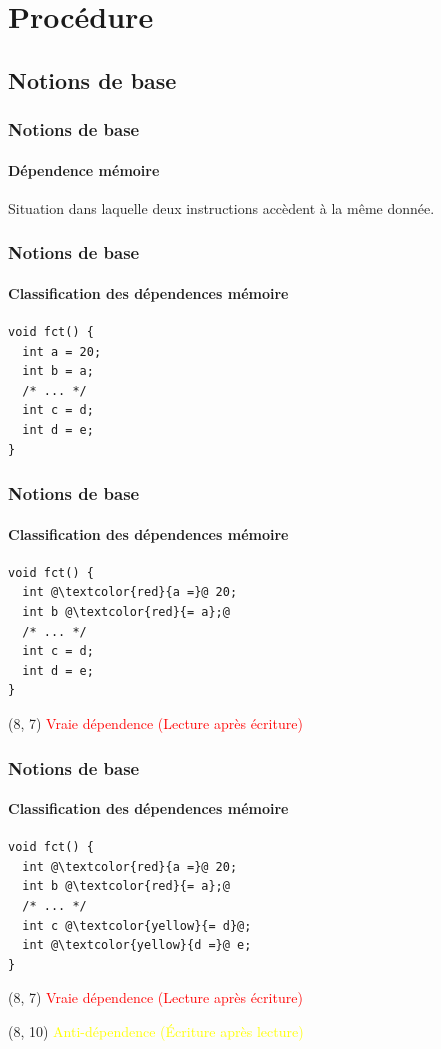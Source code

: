 \documentclass{beamer}
\begin{document}
\section{Procédure}
\subsection{Notions de base}
\begin{frame}
\frametitle{Notions de base}
\framesubtitle{Dépendence mémoire}
Situation dans laquelle deux instructions accèdent à la même donnée.
\end{frame}

\begin{frame}[fragile]
\frametitle{Notions de base}
\framesubtitle{Classification des dépendences mémoire}
\begin{lstlisting}
void fct() {
  int a = 20;
  int b = a;
  /* ... */
  int c = d;
  int d = e;
}
\end{lstlisting}
\end{frame}

\begin{frame}[fragile]
\frametitle{Notions de base}
\framesubtitle{Classification des dépendences mémoire}
\begin{lstlisting}
void fct() {
  int @\textcolor{red}{a =}@ 20;
  int b @\textcolor{red}{= a};@
  /* ... */
  int c = d;
  int d = e;
}
\end{lstlisting}

\begin{textblock}{5}(8, 7)
	 \textcolor{red}{Vraie dépendence (Lecture après écriture)}
\end{textblock}
\end{frame}

\begin{frame}[fragile]
\frametitle{Notions de base}
\framesubtitle{Classification des dépendences mémoire}
\begin{lstlisting}
void fct() {
  int @\textcolor{red}{a =}@ 20;
  int b @\textcolor{red}{= a};@
  /* ... */
  int c @\textcolor{yellow}{= d}@;
  int @\textcolor{yellow}{d =}@ e;
}
\end{lstlisting}

\begin{textblock}{5}(8, 7)
	 \textcolor{red}{Vraie dépendence (Lecture après écriture)}
\end{textblock}

\begin{textblock}{5}(8, 10)
	\textcolor{yellow}{Anti-dépendence (Écriture après lecture)}
\end{textblock}
\end{frame}
\end{document}
